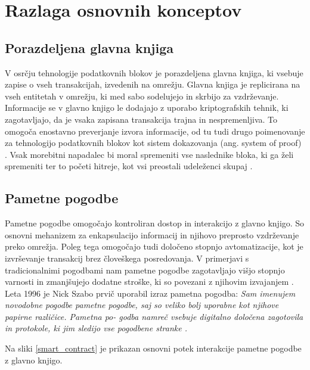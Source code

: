 \documentclass[a4paper, 12pt]{book}
\begin{document}
\section{Razlaga osnovnih konceptov}

\subsection{Porazdeljena glavna knjiga}
V osrčju tehnologije podatkovnih blokov je porazdeljena glavna knjiga, ki vsebuje zapise o vseh transakcijah, izvedenih na omrežju.
Glavna knjiga je replicirana na vseh entitetah v omrežju, ki med sabo sodelujejo in skrbijo za vzdrževanje.
Informacije se v glavno knjigo le dodajajo z uporabo kriptografskih tehnik, ki zagotavljajo, da je vsaka zapisana transakcija trajna in nespremenljiva.
To omogoča enostavno preverjanje izvora informacije, od tu tudi drugo poimenovanje za tehnologijo podatkovnih blokov kot sistem dokazovanja (ang. system of proof) \cite{hyperledgerDocs}.
Vsak morebitni napadalec bi moral spremeniti vse naslednike bloka, ki ga želi spremeniti ter to početi hitreje, kot vsi preostali udeleženci skupaj \cite{hampton2016understanding}.

\subsection{Pametne pogodbe}
Pametne pogodbe omogočajo kontroliran dostop in interakcijo z glavno knjigo.
So osnovni mehanizem za enkapsulacijo informacij in njihovo preprosto vzdrže\-vanje preko omrežja.
Poleg tega omogočajo tudi določeno stopnjo avtomatizacije, kot je izvrševanje transakcij brez človeškega posredovanja.
V primerjavi s tradicionalnimi pogodbami nam pametne pogodbe zagotavljajo višjo stopnjo varnosti in zmanjšujejo dodatne stroške, ki so povezani z njihovim izvajanjem \cite{atzei2017survey}.
Leta 1996 je Nick Szabo prvič uporabil izraz pametna pogodba:
\textit{Sam imenujem novodobne pogodbe pametne pogodbe,  saj so
veliko bolj uporabne kot njihove papirne različice.  Pametna po-
godba namreč vsebuje digitalno določena zagotovila in protokole,
ki jim sledijo vse pogodbene stranke \cite{szabo1996smart, balanticd}.}

Na sliki \ref{smart_contract} je prikazan osnovni potek interakcije pametne pogodbe z glavno knjigo.
\end{document}
